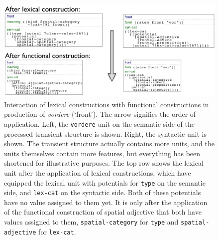 \begin{figure}
\begin{center}
\includegraphics[width=1.0\columnwidth]{figs/production-vordere}
\end{center}
\caption[Interaction of lexical and functional constructions -- syntax]{%
Interaction of lexical constructions with 
functional constructions in production of
\textit{vordere} (`front').
The arrow signifies the order of application. 
Left, the {\footnotesize\tt vordere} unit on the semantic side of the 
processed transient structure is shown. 
Right, the syntactic unit is shown. The 
transient structure actually contains more units, and the units 
themselves contain more features, but
everything has been shortened for illustrative purposes. The 
top row shows the lexical unit after
the application of lexical constructions, which have equipped 
the lexical unit with potentials
for {\footnotesize\tt type} on the semantic side, and {\footnotesize\tt lex-cat}  
on the syntactic side. Both of
these potentials have no value assigned to them yet. It is only 
after the application of the functional
construction of spatial adjective that both have values assigned 
to them, {\footnotesize\tt spatial-category}
for {\footnotesize\tt type} and {\footnotesize\tt spatial-adjective} for {\footnotesize\tt lex-cat}.}
\label{f:production-vordere}
\end{figure}

